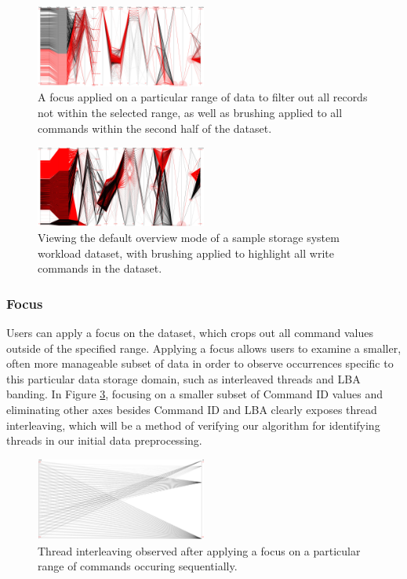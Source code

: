 \documentclass[journal]{vgtc}                %
\begin{document}
\begin{figure}[h!]
 \centering
 \includegraphics[width=0.5\textwidth]{images/brush_focus5.eps}
 \caption[Applying brushing to a range of commands in the dataset.]{A focus applied on a particular range of data to filter out all records not within the selected range, as well as brushing applied to all commands within the second half of the dataset.}
 \label{fig:brush}
\end{figure}

\begin{figure}[h!]
 \centering
 \includegraphics[width=0.5\textwidth]{images/demo.eps}
 \caption[Storage system workload dataset with write commands brushed.]{Viewing the default overview mode of a sample storage system workload dataset, with brushing applied to highlight all write commands in the dataset.}
 \label{fig:brush2}
\end{figure}

\subsubsection{Focus}
Users can apply a focus on the dataset, which crops out all command values outside of the specified range. Applying a focus allows users to examine a smaller, often more manageable subset of data in order to observe occurrences specific to this particular data storage domain, such as interleaved threads and LBA banding. In Figure \ref{fig:focus_interleaving}, focusing on a smaller subset of Command ID values and eliminating other axes besides Command ID and LBA clearly exposes thread interleaving, which will be a method of verifying our algorithm for identifying threads in our initial data preprocessing.

\begin{figure}[h!]
 \centering
 \includegraphics[width=0.5\textwidth]{images/interleaved_bw.eps}
 \caption[Thread interleaving observed by focusing on a range of data.]{Thread interleaving observed after applying a focus on a particular range of commands occuring sequentially.}
 \label{fig:focus_interleaving}
\end{figure}
\end{document}
